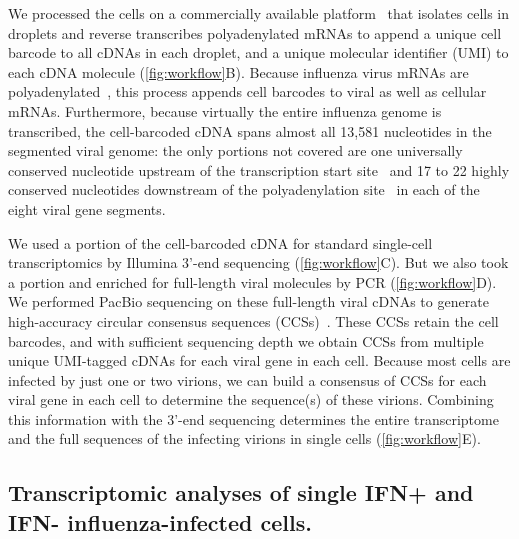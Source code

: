 \documentclass[]{asm-article}
\newcommand{\FIG}[1]{\autoref{fig:#1}}
\begin{document}
We processed the cells on a commercially available platform~\cite{zheng2017massively} that isolates cells in droplets and reverse transcribes polyadenylated mRNAs to append a unique cell barcode to all cDNAs in each droplet, and a unique molecular identifier (UMI) to each cDNA molecule (\FIG{workflow}B).
Because influenza virus mRNAs are polyadenylated~\cite{robertson1981polyadenylation}, this process appends cell barcodes to viral as well as cellular mRNAs.
Furthermore, because virtually the entire influenza genome is transcribed, the cell-barcoded cDNA spans almost all 13,581 nucleotides in the segmented viral genome: the only portions not covered are one universally conserved nucleotide upstream of the transcription start site~\cite{koppstein2015sequencing} and 17 to 22 highly conserved nucleotides downstream of the polyadenylation site~\cite{robertson1981polyadenylation} in each of the eight viral gene segments.

We used a portion of the cell-barcoded cDNA for standard single-cell transcriptomics by Illumina 3'-end sequencing (\FIG{workflow}C).
But we also took a portion and enriched for full-length viral molecules by PCR (\FIG{workflow}D).
We performed PacBio sequencing on these full-length viral cDNAs to generate high-accuracy circular consensus sequences (CCSs)~\cite{travers2010flexible}.
These CCSs retain the cell barcodes, and with sufficient sequencing depth we obtain CCSs from multiple unique UMI-tagged cDNAs for each viral gene in each cell.
Because most cells are infected by just one or two virions, we can build a consensus of CCSs for each viral gene in each cell to determine the sequence(s) of these virions.
Combining this information with the 3'-end sequencing determines the entire transcriptome and the full sequences of the infecting virions in single cells (\FIG{workflow}E).

\subsection{Transcriptomic analyses of single IFN+ and IFN- influenza-infected cells.}
\end{document}
